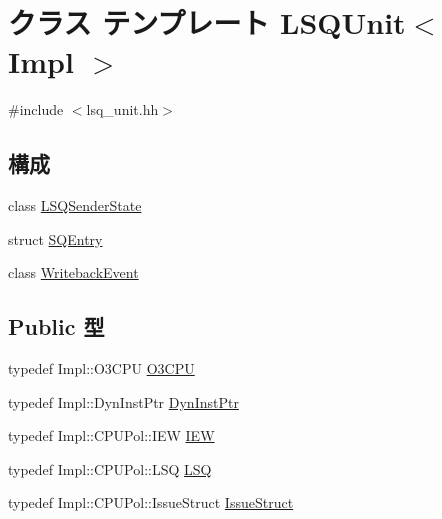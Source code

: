\hypertarget{classLSQUnit}{
\section{クラス テンプレート LSQUnit$<$ Impl $>$}
\label{classLSQUnit}
}


{\ttfamily \#include $<$lsq\_\-unit.hh$>$}\subsection*{構成}
\begin{DoxyCompactItemize}
\item 
class \hyperlink{classLSQUnit_1_1LSQSenderState}{LSQSenderState}
\item 
struct \hyperlink{structLSQUnit_1_1SQEntry}{SQEntry}
\item 
class \hyperlink{classLSQUnit_1_1WritebackEvent}{WritebackEvent}
\end{DoxyCompactItemize}
\subsection*{Public 型}
\begin{DoxyCompactItemize}
\item 
typedef Impl::O3CPU \hyperlink{classLSQUnit_a44622cf06940413482836cb62931ac3f}{O3CPU}
\item 
typedef Impl::DynInstPtr \hyperlink{classLSQUnit_a028ce10889c5f6450239d9e9a7347976}{DynInstPtr}
\item 
typedef Impl::CPUPol::IEW \hyperlink{classLSQUnit_a23f60a4095b5240dfcb18a4ec40210a9}{IEW}
\item 
typedef Impl::CPUPol::LSQ \hyperlink{classLSQUnit_acf05a3db8421d1ca800c285cf9a86301}{LSQ}
\item 
typedef Impl::CPUPol::IssueStruct \hyperlink{classLSQUnit_aa56c7524890b3a6337668c507be0f272}{IssueStruct}
\end{DoxyCompactItemize}
